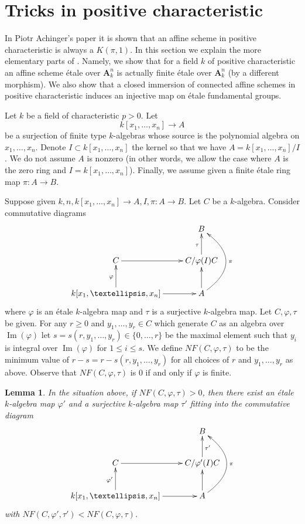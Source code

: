 \documentclass{stacks-project}
\theoremstyle{plain}
\newtheorem{lemma}[subsection]{Lemma}
\theoremstyle{definition}
\theoremstyle{remark}
\numberwithin{equation}{subsection}
\def\Im{\mathop{\mathrm{Im}}}
\begin{document}
\section{Tricks in positive characteristic}
\label{section-achinger}

\noindent
In Piotr Achinger's paper \cite{Achinger} it is shown that an
affine scheme in positive characteristic is always a $K(\pi, 1)$.
In this section we explain the more elementary parts of \cite{Achinger}.
Namely, we show that for a field $k$ of positive characteristic
an affine scheme \'etale over $\mathbf{A}^n_k$ is actually finite \'etale
over $\mathbf{A}^n_k$ (by a different morphism). We also show
that a closed immersion of connected affine schemes
in positive characteristic induces an injective map on
\'etale fundamental groups.

\medskip\noindent
Let $k$ be a field of characteristic $p > 0$.
Let
$$
k[x_1, \ldots, x_n] \longrightarrow A
$$
be a surjection of finite type $k$-algebras whose source is the
polynomial algebra on $x_1, \ldots, x_n$. Denote
$I \subset k[x_1, \ldots, x_n]$ the kernel so that we have
$A = k[x_1, \ldots, x_n]/I$. We do not assume $A$ is nonzero
(in other words, we allow the case where $A$ is the zero ring
and $I = k[x_1, \ldots, x_n]$). Finally, we assume given a
finite \'etale ring map $\pi : A \to B$.

\medskip\noindent
Suppose given $k, n, k[x_1, \ldots, x_n] \to A, I, \pi : A \to B$.
Let $C$ be a $k$-algebra. Consider
commutative diagrams
$$
\xymatrix{
& B \\
C \ar[r] & C/\varphi(I)C \ar[u]^\tau \\
k[x_1, \ldots, x_n] \ar[u]^\varphi \ar[r] &
A \ar[u] \ar@/_3em/[uu]_\pi
}
$$
where $\varphi$ is an \'etale $k$-algebra map and $\tau$ is a
surjective $k$-algebra map.
Let $C, \varphi, \tau$ be given. For any $r \geq 0$ and
$y_1, \ldots, y_r \in C$ which generate $C$ as an algebra over
$\Im(\varphi)$ let $s = s(r, y_1, \ldots, y_r) \in \{0, \ldots, r\}$
be the maximal element such that $y_i$ is integral over $\Im(\varphi)$
for $1 \leq i \leq s$. We define $NF(C, \varphi, \tau)$
to be the minimum value of
$r - s = r - s(r, y_1, \ldots, y_r)$ for all choices of
$r$ and $y_1, \ldots, y_r$ as above.
Observe that $NF(C, \varphi, \tau)$ is $0$ if and only if $\varphi$ is finite.

\begin{lemma}
\label{lemma-lower-invariant}
In the situation above, if $NF(C, \varphi, \tau) > 0$, then there exist
an \'etale $k$-algebra map $\varphi'$ and a surjective $k$-algebra map
$\tau'$ fitting into the commutative diagram
$$
\xymatrix{
& B \\
C \ar[r] & C/\varphi'(I)C \ar[u]_{\tau'} \\
k[x_1, \ldots, x_n] \ar[u]^{\varphi'} \ar[r] &
A \ar[u] \ar@/_3em/[uu]_\pi
}
$$
with $NF(C, \varphi', \tau') < NF(C, \varphi, \tau)$.
\end{lemma}
\end{document}
